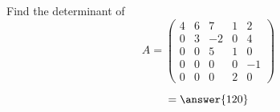 \documentclass{ximera}
\author{Parisa Fatheddin}
\begin{document}
\begin{exercise}

Find the determinant of
\[
A= \begin{pmatrix}
4 & 6 & 7 & 1 & 2\\
0 & 3 & -2 & 0 & 4\\
0 & 0 & 5 & 1 & 0\\
0 & 0 & 0 & 0 & -1\\
0 & 0 & 0 & 2 & 0
\end{pmatrix}
\]

\begin{prompt}
\[= \answer{120}
\]
\end{prompt}


\end{exercise}
\end{document}

